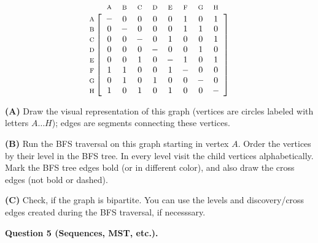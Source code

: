 \documentclass[a4paper,12pt]{article}
\newcommand{\indsize}{\scriptsize}
\newcommand{\colind}[2]{\displaystyle\smash{\mathop{#1}^{\raisebox{.5\normalbaselineskip}{\indsize #2}}}}
\newcommand{\rowind}[1]{\mbox{\indsize #1}}
\begin{document}
\vspace{10pt}
$$\begin{array}{@{}c@{}}
\rowind{A} \\ 
\rowind{B} \\ 
\rowind{C} \\ 
\rowind{D} \\ 
\rowind{E} \\ 
\rowind{F} \\ 
\rowind{G} \\ 
\rowind{H} \\
\end{array}
\mathop{\left[
\begin{array}{ *{8}{c} }
\colind{-}{A} & \colind{0}{B} & \colind{0}{C} & \colind{0}{D} & \colind{0}{E} & \colind{1}{F} & \colind{0}{G} & \colind{1}{H} \\
0 & - & 0 & 0 & 0 & 1 & 1 & 0 \\
0 & 0 & - & 0 & 1 & 0 & 0 & 1 \\
0 & 0 & 0 & - & 0 & 0 & 1 & 0 \\
0 & 0 & 1 & 0 & - & 1 & 0 & 1 \\
1 & 1 & 0 & 0 & 1 & - & 0 & 0 \\
0 & 1 & 0 & 1 & 0 & 0 & - & 0 \\
1 & 0 & 1 & 0 & 1 & 0 & 0 & - \\
\end{array}
\right]}$$


\vspace{5pt}
{\bf (A)} Draw the visual representation of this graph (vertices are circles 
labeled with letters $A\ldots{}H$); edges are segments connecting these vertices. 

{\bf (B)} Run the BFS traversal on this graph starting in vertex $A$. 
Order the vertices by their level in the BFS tree. In every level visit 
the child vertices alphabetically.
Mark the BFS tree edges bold (or in different color), and also 
draw the cross edges (not bold or dashed).

{\bf (C)} Check, if the graph is bipartite. You can use the
levels and discovery/cross edges created during the BFS traversal, if necesssary.





\newpage


\vspace{20pt}
{\bf Question 5 (Sequences, MST, etc.).} 
\end{document}
